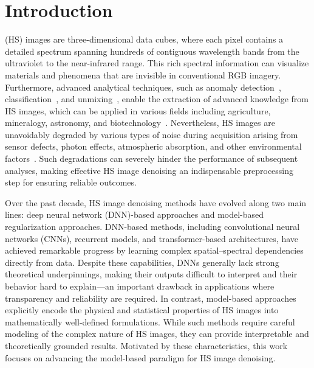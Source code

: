 \section{Introduction}
 (HS) images are three-dimensional data cubes, where each pixel contains a detailed spectrum spanning hundreds of contiguous wavelength bands from the ultraviolet to the near-infrared range. This rich spectral information can visualize materials and phenomena that are invisible in conventional RGB imagery. Furthermore, advanced analytical techniques, such as anomaly detection~\cite{Matteoli2014Anomaly, Su2022Anomaly}, classification~\cite{Ghamisi2017Classification,Li2019Classification,Nicolas2019Classification}, and unmixing~\cite{Bioucas-Dias2012UnmixingOverview,Ma2014UnmixingOverview}, enable the extraction of advanced knowledge from HS images, which can be applied in various fields including agriculture, mineralogy, astronomy, and biotechnology~\cite{Borengasser2007HSIApplications,Grahn2007Techniques, Thenkabail2016VegetationOverview,Lu2020AgricultureOverview}. Nevertheless, HS images are unavoidably degraded by various types of noise during acquisition arising from sensor defects, photon effects, atmospheric absorption, and other environmental factors~\cite{Shen2015DenoisingOverview, Rasti2018DenoisingOverview, Shen2022DenoisingOverview}. Such degradations can severely hinder the performance of subsequent analyses, making effective HS image denoising an indispensable preprocessing step for ensuring reliable outcomes.


Over the past decade, HS image denoising methods have evolved along two main lines: deep neural network (DNN)-based approaches and model-based regularization approaches. DNN-based methods, including convolutional neural networks (CNNs), recurrent models, and transformer-based architectures, have achieved remarkable progress by learning complex spatial–spectral dependencies directly from data.  Despite these capabilities, DNNs generally lack strong theoretical underpinnings, making their outputs difficult to interpret and their behavior hard to explain—an important drawback in applications where transparency and reliability are required. In contrast, model-based approaches explicitly encode the physical and statistical properties of HS images into mathematically well-defined formulations. While such methods require careful modeling of the complex nature of HS images, they can provide interpretable and theoretically grounded results. Motivated by these characteristics, this work focuses on advancing the model-based paradigm for HS image denoising.


